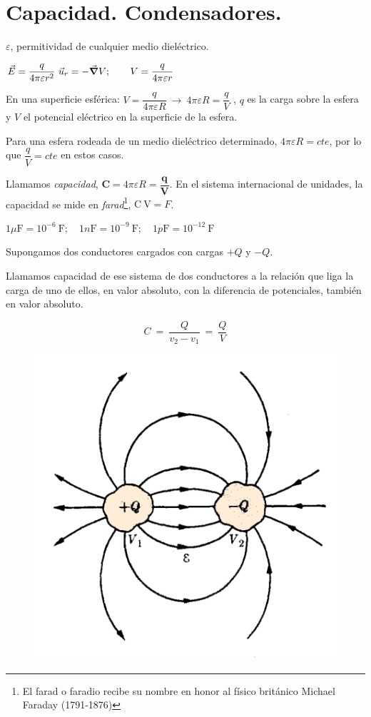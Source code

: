 \section{Capacidad. Condensadores.}

$\varepsilon$, permitividad de cualquier medio dieléctrico.

$\vec E=\dfrac {q} {4\pi \varepsilon r^2} \ \vec u_r=-\vec {\grad} V; \qquad V=\dfrac {q} {4\pi \varepsilon r} $

En una superficie esférica: $V=\dfrac {q} {4\pi \varepsilon R} \ \to \ 4 \pi \varepsilon R= \dfrac q V$ , $q$ es la carga sobre la esfera y $V$ el potencial eléctrico en la superficie de la esfera.

Para una esfera rodeada de un medio dieléctrico determinado, $4\pi \varepsilon R=cte$, por lo que $\dfrac q V =cte$ en estos casos.

Llamamos \emph{capacidad}, $\boldsymbol{ C=}4\pi \varepsilon R=\boldsymbol{ \dfrac q V}$.  En el sistema internacional de unidades, la capacidad se mide en \emph{farad}\footnote{El farad o faradio recibe su nombre en honor al físico británico Michael Faraday (1791-1876)}, $\mathrm {C \ V}=F$.

$1 \mu\mathrm{F} = 10^{-6} \ \mathrm{F}; \quad 1 n\mathrm{F}=10^{-9} \ \mathrm{F}; \quad 1 p\mathrm{F}=10^{-12} \ \mathrm{F}$

\begin{multicols}{2}
Supongamos dos conductores cargados con cargas $+Q$ y $-Q$.

Llamamos capacidad de ese sistema de dos conductores a la relación que liga la carga de uno de ellos, en valor absoluto,  con la diferencia de potenciales, también en valor absoluto.

$$C\ = \ \dfrac{Q}{v_2-v_1} \ = \ \dfrac Q V$$
\begin{figure}[H]
	\centering
	\includegraphics[width=.3\textwidth]{imagenes/imagenes24/T24IM11.png}
\end{figure}	
\end{multicols}

